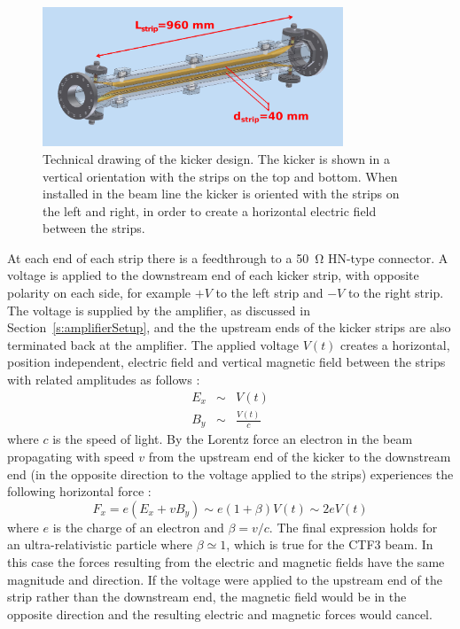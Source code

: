 \begin{figure}
  \centering
  \includegraphics[width=0.8\textwidth]{Figures/optics/kickerSchematic}
  \caption{Technical drawing of the kicker design. The kicker is shown in a vertical orientation with the strips on the top and bottom. When installed in the beam line the kicker is oriented with the strips on the left and right, in order to create a horizontal electric field between the strips.}
  \label{f:kickerSchematic}
\end{figure}

At each end of each strip there is a feedthrough to a 50~\(\mathrm{\Omega}\) HN-type connector. A voltage is applied to the downstream end of each kicker strip, with opposite polarity on each side, for example \(+V\) to the left strip and \(-V\) to the right strip. The voltage is supplied by the amplifier, as discussed in Section~\ref{s:amplifierSetup}, and the the upstream ends of the kicker strips are also terminated back at the amplifier. The applied voltage \(V(t)\) creates a horizontal, position independent, electric field and vertical magnetic field between the strips with related amplitudes as follows \cite{byrdKicker}:
\begin{eqnarray}
E_x &\sim& V(t) \\
B_y &\sim& \frac{V(t)}{c}
\end{eqnarray}
where \(c\) is the speed of light. By the Lorentz force an electron in the beam propagating with speed \(v\) from the upstream end of the kicker to the downstream end (in the opposite direction to the voltage applied to the strips) experiences the following horizontal force \cite{byrdKicker}:
\begin{equation}
F_x = e(E_x + vB_y) \sim e(1+\beta)V(t) \sim 2eV(t)
\end{equation}
where \(e\) is the charge of an electron and \(\beta = v/c\). The final expression holds for an ultra-relativistic particle where \(\beta \simeq 1\), which is true for the CTF3 beam. In this case the forces resulting from the electric and magnetic fields have the same magnitude and direction. If the voltage were applied to the upstream end of the strip rather than the downstream end, the magnetic field would be in the opposite direction and the resulting electric and magnetic forces would cancel. 

